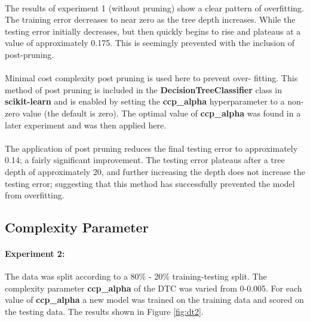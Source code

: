 \documentclass[12pt, letterpaper]{article}
\begin{document}
\paragraph*{}The results of experiment 1 (without pruning) show a clear pattern
of overfitting. The training error decreases to near zero as the tree depth
increases. While the testing error initially decreases, but then quickly 
begins to rise and plateaus at a value of approximately 0.175. This is
seemingly prevented with the inclusion of post-pruning.

\paragraph*{}Minimal cost complexity post pruning is used here to prevent over-
fitting. This method of post pruning is included in the \textbf{DecisionTreeClassifier}
class in \textbf{scikit-learn} and is enabled by setting the \textbf{ccp\_alpha}
hyperparameter to a non-zero value (the default is zero). The optimal value of
\textbf{ccp\_alpha} was found in a later experiment and was then applied here.

\paragraph*{}The application of post pruning reduces the final testing error 
to approximately 0.14; a fairly significant improvement. The testing error plateaus
after a tree depth of approximately 20, and further increasing the depth does not
increase the testing error; suggesting that this method has successfully prevented
the model from overfitting.

\subsection{Complexity Parameter}

\paragraph*{Experiment 2:} The data was split according to a 80\% - 20\%
training-testing split. The complexity parameter \textbf{ccp\_alpha} of the DTC
was varied from 0-0.005. For each value of \textbf{ccp\_alpha} a new model was
trained on the training data and scored on the testing data. The results shown
in Figure \ref{fig:dt2}.
\end{document}

